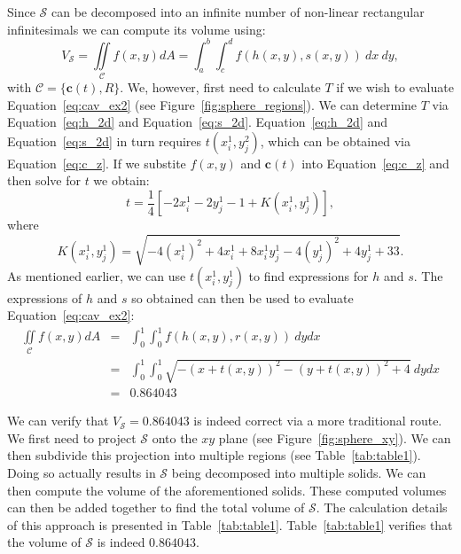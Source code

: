 \documentclass{article}
\theoremstyle{theorem}
\theoremstyle{definition}
\begin{document}
\noindent
Since $\mathcal{S}$ can be decomposed into an infinite number of non-linear rectangular infinitesimals we can compute its volume using:
\begin{equation}
\label{eq:cav_ex2}
V_{\mathcal{S}} = \iint\limits_{\!\mathcal{C}} f(x,y) dA =  \int_a^b\int_c^d f(h(x,y),s(x,y))~dx~dy,
\end{equation}
with $\mathcal{C}=\{\mathbf{c}(t),R\}$. We, however, first need to calculate $T$ if we wish to evaluate Equation~\ref{eq:cav_ex2} (see Figure~\ref{fig:sphere_regions}). We can determine $T$ via 
Equation~\eqref{eq:h_2d} and Equation~\eqref{eq:s_2d}. Equation~\eqref{eq:h_2d} and Equation~\eqref{eq:s_2d} in turn requires $t(x_i^1,y_j^2)$, which can be obtained via Equation~\eqref{eq:c_z}.
If we substite $f(x,y)$ and $\mathbf{c}(t)$ into Equation~\eqref{eq:c_z} and then solve for $t$ we obtain:
\begin{equation}
t = \frac{1}{4}[-2 x_{i}^1 - 2 y_{j}^1  -  1 + K(x_{i}^1,y_{j}^1)],
\end{equation}
where
\begin{equation}
K(x_{i}^1,y_{j}^1) = \sqrt{-4(x_{i}^1)^2+4x_{i}^1+8x_{i}^1y_{j}^1-4(y_{j}^1)^2+4y_{j}^1 + 33}. 
\end{equation}
As mentioned earlier, we can use $t(x_i^1,y_j^1)$ to find expressions for $h$ and $s$. The expressions of $h$ and $s$ so obtained can then be used to evaluate Equation~\eqref{eq:cav_ex2}:  
\begin{eqnarray}
\iint\limits_{\!\mathcal{C}} f(x,y) dA &=& \int_0^1\int_0^1 f(h(x,y),r(x,y))~dydx\\
&=& \int_0^1 \int_0^1 \sqrt{-(x+t(x,y))^2 - (y+t(x,y))^2 + 4} ~dydx\\
&=& 0.864043
\end{eqnarray}

\noindent
We can verify that $V_{\mathcal{S}}=0.864043$ is indeed correct via a more traditional route. We first need to project $\mathcal{S}$ onto the $xy$ plane (see Figure~\ref{fig:sphere_xy}). We can then subdivide this projection into multiple regions (see Table~\ref{tab:table1}). Doing so actually results in $\mathcal{S}$ being decomposed into multiple solids. We can then 
compute the volume of the aforementioned solids. These computed volumes can then be added together to find the total volume of $\mathcal{S}$. The calculation details 
of this approach is presented in Table~\ref{tab:table1}. Table~\ref{tab:table1} verifies that the volume of $\mathcal{S}$ is indeed $0.864043$.
\end{document}
